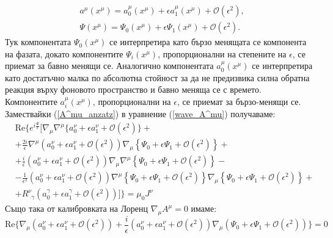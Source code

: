 \begin{subequations}
	\begin{align}
		&a^\mu(x^\mu) = a_0^\mu(x^\mu) + \epsilon a_1^\mu(x^\mu) + \mathcal{O}(\epsilon^2),\\
		&\Psi(x^\mu) = \Psi_0(x^\mu) + \epsilon \Psi_1(x^\mu) + \mathcal{O}(\epsilon^2).
	\end{align}
\end{subequations}
Тук компонентата $\Psi_0(x^\mu)$ се интерпретира като бързо менящата се компонента на фазата, докато компонентите $\Psi_i(x^\mu)$, пропорционални на степените на $\epsilon$, се приемат за бавно менящи се. Аналогично компонентата $a_0^\mu(x^\mu)$ се интерпретира като достатъчно малка по абсолютна стойност за да не предизвика силна обратна реакция върху фоновото пространство и бавно меняща се с времето. Компонентите $a_i^\mu(x^\mu)$, пропорционални на $\epsilon$, се приемат за бързо-менящи се. Замествайки (\ref{A^mu_anzatz}) в уравнение (\ref{wave_A^mu}) получаваме:
\begin{equation}
	\begin{split}
	&\text{Re}\bigg\{ e^{i\frac{\Psi}{\epsilon}}  \bigg[  \nabla_{\mu}\nabla^\mu\{a_0^\nu + \epsilon a_1^\nu + \mathcal{O}(\epsilon^2) \} + \\
	& + \frac{2i}{\epsilon} \nabla^{\mu}\left( a_0^\nu + \epsilon a_1^\nu + \mathcal{O}(\epsilon^2) \right) \nabla_\mu \left\{\Psi_0 + \epsilon \Psi_1 + \mathcal{O}(\epsilon^2) \right\} + \\
	 & + \frac{i}{\epsilon} \left(a_0^\nu + \epsilon a_1^\nu + \mathcal{O}(\epsilon^2) \right) \nabla_\mu\nabla^\mu\left\{\Psi_0 + \epsilon \Psi_1 + \mathcal{O}(\epsilon^2) \right\} - \\
	 & - \frac{1}{\epsilon^2} \left(a_0^\nu + \epsilon a_1^\nu + \mathcal{O}(\epsilon^2) \right) \nabla^\mu\left\{ \Psi_0 + \epsilon \Psi_1 + \mathcal{O}(\epsilon^2) \right\}\nabla_\mu\left\{\Psi_0 + \epsilon \Psi_1 + \mathcal{O}(\epsilon^2)\right\} + \\
	 & + R^\nu_{\,\,\,\gamma} \left( a_0^\gamma + \epsilon a_1^\gamma + \mathcal{O}(\epsilon^2) \right) \bigg] \bigg\}  = \mu_0 J^\nu
	\end{split}
\end{equation}
Също така от калибровката на Лоренц $\nabla_\mu A^\mu = 0$ имаме:
\begin{equation}
	\text{Re}\big\{\nabla_\mu\left(a_0^\nu + \epsilon a_1^\nu + \mathcal{O}(\epsilon^2)\right) + \frac{i}{\epsilon}\left(a_0^\nu + \epsilon a_1^\nu + \mathcal{O}(\epsilon^2)\right)\nabla_\mu\left(\Psi_0 + \epsilon \Psi_1 + \mathcal{O}(\epsilon^2) \right)\big\} = 0
\end{equation}

